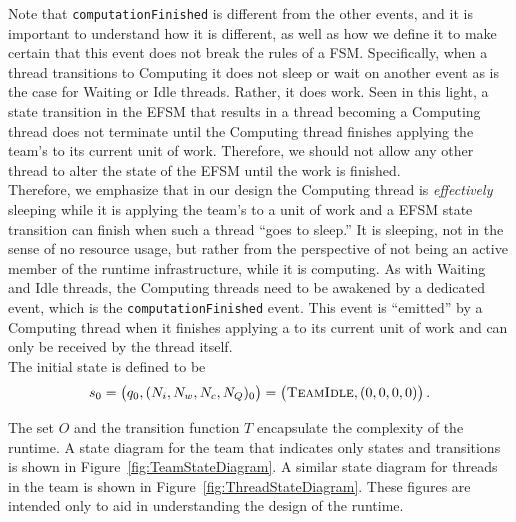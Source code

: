 \documentclass{article}
\begin{document}
Note that \texttt{computationFinished} is different from the other events, and it
is important to understand how it is different, as well as how we define it to
make certain that this event does not break the rules of a FSM.  Specifically,
when a thread transitions to Computing it does not sleep or wait on another
event as is the case for Waiting or Idle threads.  Rather, it does work.  Seen
in this light, a state transition in the EFSM that results in a thread becoming
a Computing thread does not terminate until the Computing thread finishes
applying the team's \taskroutine to its current unit of work.  Therefore, we should not
allow any other thread to alter the state of the EFSM until the work is
finished.\\

Therefore, we emphasize that in our design the Computing thread is
\textit{effectively} sleeping while it is applying the team's \taskroutine to a unit of
work and a EFSM state transition can finish when such a thread ``goes to
sleep.''  It is sleeping, not in the sense of no resource usage, but rather from
the perspective of not being an active member of the runtime infrastructure,
while it is computing.  As with Waiting and Idle threads, the Computing threads
need to be awakened by a dedicated event, which is the
\texttt{computationFinished} event.  This event is ``emitted'' by a Computing
thread when it finishes applying a \taskroutine to its current unit of work and can only
be received by the thread itself.\\

The initial state is defined to be
\[
s_0 = \left(q_0, (N_i, N_w, N_c, N_Q)_0\right) = \left(\textsc{TeamIdle}, (0, 0, 0, 0)\right).
\]

The set $O$ and the transition function $T$ encapsulate the complexity of the
runtime.  A state diagram for the team
that indicates only states and transitions is shown in
Figure~\ref{fig:TeamStateDiagram}.  A similar state diagram for threads in the
team is shown in Figure~\ref{fig:ThreadStateDiagram}.  These figures are
intended only to aid in understanding the design of the runtime. \\
\end{document}
